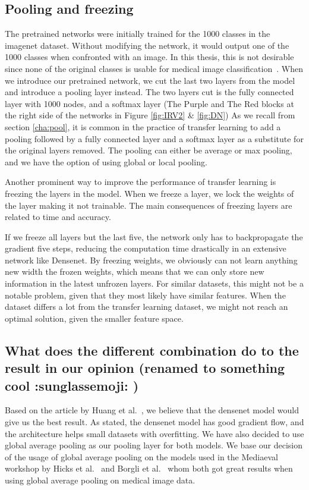\subsection{Pooling and freezing}
The pretrained networks were initially trained for the 1000 classes in the imagenet dataset. Without modifying the network, it would output one of the 1000 classes when confronted with an image. In this thesis, this is not desirable since none of the original classes is usable for medical image classification~\cite{imagenet_cvpr09,imagenet}.
When we introduce our pretrained network, we cut the last two layers from the model and introduce a pooling layer instead.
The two layers cut is the fully connected layer with 1000 nodes, and a softmax layer (The Purple and The Red blocks at the right side of the networks in Figure \ref{fig:IRV2} \& \ref{fig:DN})
As we recall from section \ref{cha:pool}, it is common in the practice of transfer learning to add a pooling followed by a fully connected layer and a softmax layer as a substitute for the original layers removed.  The pooling can either be average or max pooling, and we have the option of using global or local pooling. 

Another prominent way to improve the performance of transfer learning is freezing the layers in the model. When we freeze a layer, we lock the weights of the layer making it not trainable.
The main consequences of freezing layers are related to time and accuracy. 

If we freeze all layers but the last five, the network only has to backpropagate the gradient five steps, reducing the computation time drastically in an extensive network like Densenet. 
By freezing weights, we obviously can not learn anything new width the frozen weights, which means that we can only store new information in the latest unfrozen layers. For similar datasets, this might not be a notable problem, given that they most likely have similar features. When the dataset differs a lot from the transfer learning dataset, we might not reach an optimal solution, given the smaller feature space.





\subsection{What does the different combination do to the result in our opinion (renamed to something cool :sunglassemoji: )}
Based on the article by Huang et al.~\cite{Huang_2017}, we believe that the densenet model would give us the best result. As stated, the densenet model has good gradient flow, and the architecture helps small datasets with overfitting. 
We have also decided to use global average pooling as our pooling layer for both models. We base our decision of the usage of global average pooling on the models used in the Mediaeval workshop by Hicks et al.~\cite{26207} and Borgli et al.~\cite{runeMedico2018} whom both got great results when using global average pooling on medical image data.


